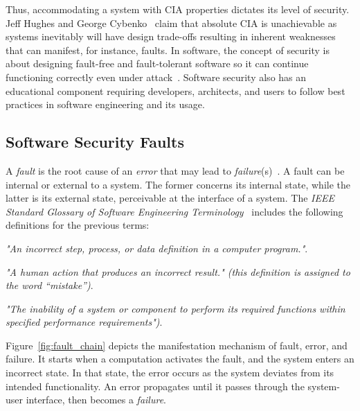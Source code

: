 Thus, accommodating a system with \ac{CIA} properties dictates its level of security. Jeff Hughes and George Cybenko~\cite{Hughes2013QuantitativeMA} claim that absolute CIA is unachievable as systems inevitably will have design trade-offs resulting in inherent weaknesses that can manifest, for instance, faults. In software, the concept of security is about designing fault-free and fault-tolerant software so it can continue functioning correctly even under attack~\cite{McGraw2004SoftwareS}. Software security also has an educational component requiring developers, architects, and users to follow best practices in software engineering and its usage. 

\subsection{Software Security Faults}
A \textit{fault} is the root cause of an \textit{error} that may lead to \textit{failure}(s)~\cite{taxonomy_security_flaws}. A fault can be internal or external to a system. The former concerns its internal state, while the latter is its external state, perceivable at the interface of a system. The \textit{IEEE Standard Glossary of Software Engineering Terminology}~\cite{standard_terms} includes the following definitions for the previous terms: 

\theoremstyle{definition}
\begin{definition}[Fault]
\textit{"An incorrect step, process, or data definition in a computer program."}. 
\end{definition}

\theoremstyle{definition}
\begin{definition}[Error]
\textit{"A human action that produces an incorrect result." (this definition is assigned to the word ``mistake'')}. 
\end{definition}

\theoremstyle{definition}
\begin{definition}[Failure]
\textit{"The inability of a system or component to perform its required functions within specified performance requirements")}. 
\end{definition}


Figure~\ref{fig:fault_chain} depicts the manifestation mechanism of fault, error, and failure. It starts when a computation activates the fault, and the system enters an incorrect state. In that state, the error occurs as the system deviates from its intended functionality. An error propagates until it passes through the system-user interface, then becomes a \textit{failure}.

